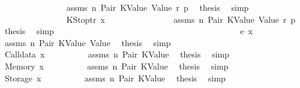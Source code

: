 \begin{isabellebody}
\ \ \ \ \ \ \ \ \ \ \ \ \ \ \isamarkupfalse%
\ assms\ n\ Pair\ KValue\ Value\ r{}\ p{}\ \isamarkupfalse%
\ {\isacharquery}{\kern0pt}thesis\ \isamarkupfalse%
\ simp\isanewline
\ \ \ \ \ \ \ \ \ \ \ \ \isamarkupfalse%
\isanewline
\ \ \ \ \ \ \ \ \ \ \ \ \ \ \isamarkupfalse%
\ {\isacharparenleft}{\kern0pt}KStoptr\ x{}{\isacharparenright}{\kern0pt}\isanewline
\ \ \ \ \ \ \ \ \ \ \ \ \ \ \isamarkupfalse%
\ assms\ n\ Pair\ KValue\ Value\ r{}\ p{}\ \isamarkupfalse%
\ {\isacharquery}{\kern0pt}thesis\ \isamarkupfalse%
\ simp\isanewline
\ \ \ \ \ \ \ \ \ \ \ \ \isamarkupfalse%
\isanewline
\ \ \ \ \ \ \ \ \ \ \isamarkupfalse%
\isanewline
\ \ \ \ \ \ \ \ \isamarkupfalse%
\isanewline
\ \ \ \ \ \ \ \ \ \ \isamarkupfalse%
\ {\isacharparenleft}{\kern0pt}e\ x{\isacharparenright}{\kern0pt}\isanewline
\ \ \ \ \ \ \ \ \ \ \isamarkupfalse%
\ assms\ n\ Pair\ KValue\ Value\ \isamarkupfalse%
\ {\isacharquery}{\kern0pt}thesis\ \isamarkupfalse%
\ simp\isanewline
\ \ \ \ \ \ \ \ \isamarkupfalse%
\isanewline
\ \ \ \ \ \ \isamarkupfalse%
\isanewline
\ \ \ \ \ \ \ \ \isamarkupfalse%
\ {\isacharparenleft}{\kern0pt}Calldata\ x{}{\isacharparenright}{\kern0pt}\isanewline
\ \ \ \ \ \ \ \ \isamarkupfalse%
\ assms\ n\ Pair\ KValue\ \isamarkupfalse%
\ {\isacharquery}{\kern0pt}thesis\ \isamarkupfalse%
\ simp\isanewline
\ \ \ \ \ \ \isamarkupfalse%
\isanewline
\ \ \ \ \ \ \ \ \isamarkupfalse%
\ {\isacharparenleft}{\kern0pt}Memory\ x{}{\isacharparenright}{\kern0pt}\isanewline
\ \ \ \ \ \ \ \ \isamarkupfalse%
\ assms\ n\ Pair\ KValue\ \isamarkupfalse%
\ {\isacharquery}{\kern0pt}thesis\ \isamarkupfalse%
\ simp\isanewline
\ \ \ \ \ \ \isamarkupfalse%
\isanewline
\ \ \ \ \ \ \ \ \isamarkupfalse%
\ {\isacharparenleft}{\kern0pt}Storage\ x{}{\isacharparenright}{\kern0pt}\isanewline
\ \ \ \ \ \ \ \ \isamarkupfalse%
\ assms\ n\ Pair\ KValue\ \isamarkupfalse%
\ {\isacharquery}{\kern0pt}thesis\ \isamarkupfalse%
\ simp\isanewline
\ \ \ \ \ \ \isamarkupfalse%
\isanewline
\ \ \ \ \isamarkupfalse%

\end{isabellebody}
